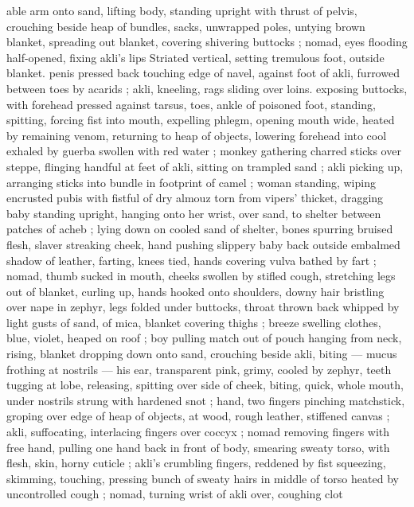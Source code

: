 {able arm onto sand, lifting body, standing upright with thrust of 
pelvis, crouching beside heap of bundles, sacks, unwrapped poles, 
untying brown blanket, spreading out blanket, covering shivering 
buttocks ; nomad, eyes flooding half-opened, fixing akli's lips 
Striated vertical, setting tremulous foot, outside blanket. penis 
pressed back touching edge of navel, against foot of akli, furrowed 
between toes by acarids ; akli, kneeling, rags sliding over loins. 
exposing buttocks, with forehead pressed against tarsus, toes, ankle 
of poisoned foot, standing, spitting, forcing fist into mouth, expelling 
phlegm, opening mouth wide, heated by remaining venom, returning 
to heap of objects, lowering forehead into cool exhaled by guerba 
swollen with red water ; monkey gathering charred sticks over 
steppe, flinging handful at feet of akli, sitting on trampled sand ; akli 
picking up, arranging sticks into bundle in footprint of camel ; woman 
standing, wiping encrusted pubis with fistful of dry almouz torn from 
vipers' thicket, dragging baby standing upright, hanging onto her 
wrist, over sand, to shelter between patches of acheb ; lying down on 
cooled sand of shelter, bones spurring bruised flesh, slaver 
streaking cheek, hand pushing slippery baby back outside embalmed 
shadow of leather, farting, knees tied, hands covering vulva bathed 
by fart ; nomad, thumb sucked in mouth, cheeks swollen by stifled 
cough, stretching legs out of blanket, curling up, hands hooked onto 
shoulders, downy hair bristling over nape in zephyr, legs folded 
under buttocks, throat thrown back whipped by light gusts of sand, 
of mica, blanket covering thighs ; breeze swelling clothes, blue, 
violet, heaped on roof ; boy pulling match out of pouch hanging from 
neck, rising, blanket dropping down onto sand, crouching beside akli, 
biting --- mucus frothing at nostrils --- his ear, transparent pink, 
grimy, cooled by zephyr, teeth tugging at lobe, releasing, spitting 
over side of cheek, biting, quick, whole mouth, under nostrils strung 
with hardened snot ; hand, two fingers pinching matchstick, groping 
over edge of heap of objects, at wood, rough leather, stiffened 
canvas ; akli, suffocating, interlacing fingers over coccyx ; nomad 
removing fingers with free hand, pulling one hand back in front of 
body, smearing sweaty torso, with flesh, skin, horny cuticle ; akli's 
crumbling fingers, reddened by fist squeezing, skimming, touching, 
pressing bunch of sweaty hairs in middle of torso heated by 
uncontrolled cough ; nomad, turning wrist of akli over, coughing clot 
}
